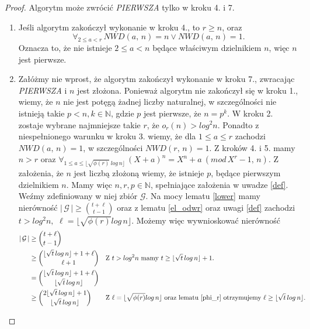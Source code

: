 \documentclass[polish,declaration,shortabstract]{iithesis}
\theoremstyle{definition}
\theoremstyle{remark} \newtheorem{observation}{Obserwacja}
\theoremstyle{plain} \newtheorem{theorem}{Twierdzenie}
\theoremstyle{plain} \newtheorem{lemma}{Lemat}
\theoremstyle{remark} \newtheorem*{remark*}{Uwaga}
\theoremstyle{reminder} \newtheorem*{reminder*}{Przypomnienie}
\begin{document}
\begin{proof}
	Algorytm może zwrócić \textit{PIERWSZA} tylko w kroku 4. i 7.
	\begin{enumerate}[label=(\arabic*),leftmargin=.4in]
		\item Jeśli algorytm zakończył wykonanie w kroku 4., to $r \geq n$, oraz \[\forall_{2 \leq a < r} \, NWD(a, \, n) = n \vee NWD(a, \, n) = 1.\] Oznacza to, że nie istnieje $2 \leq a < n$ będące właściwym dzielnikiem $n$, więc $n$ jest pierwsze.
		\item Załóżmy nie wprost, że algorytm zakończył wykonanie w kroku 7., zwracając \textit{PIERWSZA} i $n$ jest złożona. Ponieważ algorytm nie zakończył się w kroku 1., wiemy, że $n$ nie jest potęgą żadnej liczby naturalnej, w szczególności nie istnieją takie $p < n, k \in \mathbb{N}$, gdzie $p$ jest pierwsze, że $n = p^k$. W kroku 2. zostaje wybrane najmniejsze takie $r$, że $o_r(n) > log^2n$. Ponadto z niespełnionego warunku w kroku 3. wiemy, że dla $1 \leq a \leq r$ zachodzi $NWD(a, \, n) = 1$, w szczególności $NWD(r, \, n) = 1$. Z kroków 4. i 5. mamy $n > r$ oraz ${\forall_{1 \leq a \leq \lfloor \sqrt{\phi(r)} \, log \, n \rfloor} \, (X + a)^n = X^n + a \: (mod \, X^r - 1, \, n).}$ Z założenia, że $n$ jest liczbą złożoną wiemy, że istnieje $p$, będące pierwszym dzielnikiem $n$. Mamy więc $n, r, p \in \mathbb{N}$, spełniające założenia w uwadze \ref{def}. Weźmy zdefiniowany w niej zbiór $\mathcal{G}$. Na mocy lematu \ref{lower} mamy nierówność $| \, \mathcal{G} \, | \geq {t + \ell \choose t - 1}$ oraz z lematu \ref{el_odwr} oraz uwagi \ref{def} zachodzi ${t > log^2n,}$ ${\ell = \lfloor \sqrt{\phi(r)}log \, n \rfloor.}$ Możemy więc wywnioskować nierówność
		      \begin{align*}
		      	| \, \mathcal{G} \, | &\geq {t + \ell \choose t - 1} \\
		      	  & \geq {\lfloor \sqrt{t}\, log \, n \rfloor + 1 + \ell \choose \ell + 1}                      &   & \text{Z ${t > log^2n}$ mamy ${t \geq \lfloor \sqrt{t}\, log \, n} \rfloor + 1$.}                                                               \\
		      	& = {\lfloor \sqrt{t}\, log \, n \rfloor + 1 + \ell \choose \lfloor \sqrt{t}\, log \, n \rfloor} \\
		      	  & \geq {2\lfloor \sqrt{t}\, log \, n \rfloor + 1 \choose \lfloor \sqrt{t}\, log \, n \rfloor} &   & \text{Z $\ell = \lfloor \sqrt{\phi(r)}log \, n \rfloor$ oraz lematu \ref{phi_r} otrzymujemy $\ell \geq \lfloor \sqrt{t} \, log \, n \rfloor$.} \\

\end{align*}
\end{enumerate}
\end{proof}
\end{document}
